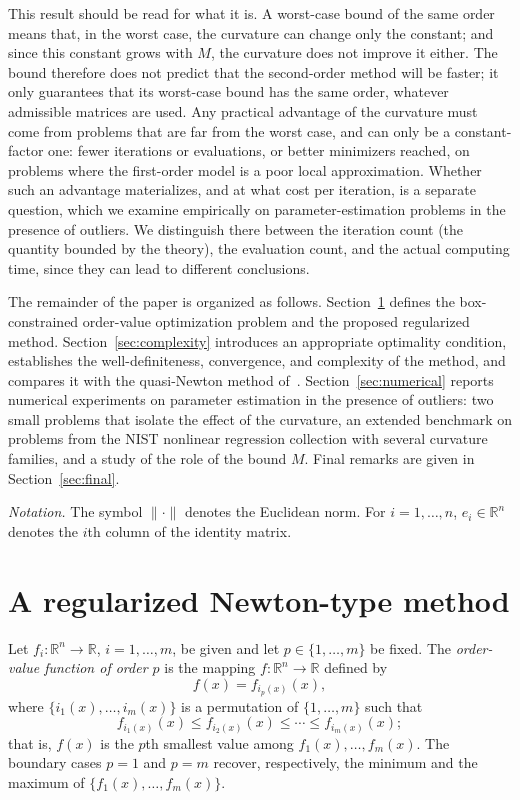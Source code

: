 \documentclass[11pt]{article}
\begin{document}
This result should be read for what it is. A worst-case bound of the same order
means that, in the worst case, the curvature can change only the constant; and
since this constant grows with $M$, the curvature does not improve it either. The bound therefore does not predict that the second-order method will
be faster; it only guarantees that its worst-case bound has the same order,
whatever admissible matrices are used. Any practical advantage of the curvature must come from
problems that are far from the worst case, and can only be a constant-factor
one: fewer iterations or evaluations, or better minimizers reached, on problems
where the first-order model is a poor local approximation. Whether such an
advantage materializes, and at what cost per iteration, is a separate question,
which we examine empirically on parameter-estimation problems in the presence
of outliers. We distinguish there between the iteration count (the quantity
bounded by the theory), the evaluation count, and the actual computing time,
since they can lead to different conclusions.

The remainder of the paper is organized as follows. Section~\ref{sec:method}
defines the box-constrained order-value optimization problem and the proposed
regularized method. Section~\ref{sec:complexity} introduces an appropriate
optimality condition, establishes the well-definiteness, convergence, and
complexity of the method, and compares it with the quasi-Newton method
of~\cite{yano1}. Section~\ref{sec:numerical} reports numerical experiments on
parameter estimation in the presence of outliers: two small problems that
isolate the effect of the curvature, an extended benchmark on problems from the
NIST nonlinear regression collection with several curvature families, and a
study of the role of the bound $M$. Final remarks are given in
Section~\ref{sec:final}.

\medskip
\noindent\textit{Notation.} The symbol $\|\cdot\|$ denotes the Euclidean norm.
For $i=1,\dots,n$, $e_i\in\mathbb{R}^{n}$ denotes the $i$th column of the
identity matrix.

\section{A regularized Newton-type method} \label{sec:method}

Let $f_i : \mathbb{R}^n \to \mathbb{R}$, $i = 1, \ldots, m$, be given and let
$p \in \{1, \ldots, m\}$ be fixed. The \textit{order-value function of order
$p$} is the mapping $f : \mathbb{R}^n \to \mathbb{R}$ defined by
\begin{equation}
    f(x) = f_{i_p(x)}(x), \label{ovo-function}
\end{equation}
where $\{i_1(x), \ldots, i_m(x)\}$ is a permutation of $\{1, \ldots, m\}$ such
that
\begin{equation}
    f_{i_1(x)}(x) \leq f_{i_2(x)}(x) \leq \cdots \leq f_{i_m(x)}(x);
    \label{fi-sort}
\end{equation}
that is, $f(x)$ is the $p$th smallest value among $f_1(x), \ldots, f_m(x)$.
The boundary cases $p = 1$ and $p = m$ recover, respectively, the minimum and
the maximum of $\{f_1(x), \ldots, f_m(x)\}$.
\end{document}
